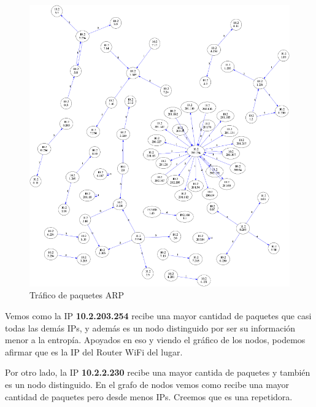 \begin{figure}[H]
       \centering
       \includegraphics[width=1\textwidth]{../resultados/labo-corrida3/network.png}
       \caption{Tráfico de paquetes ARP}
       \label{red-Starbucks-dst-information}
\end{figure}

Vemos como la IP \textbf{10.2.203.254} recibe una mayor cantidad de paquetes que casi todas las demás IPs, y además es un nodo distinguido por ser su información menor a la entropía. Apoyados en eso y viendo el gráfico de los nodos, podemos afirmar que es la IP del Router WiFi del lugar.

Por otro lado, la IP \textbf{10.2.2.230} recibe una mayor cantida de paquetes y  también es un nodo distinguido. En el grafo de nodos vemos como recibe una mayor cantidad de paquetes pero desde menos IPs. Creemos que es una repetidora.
